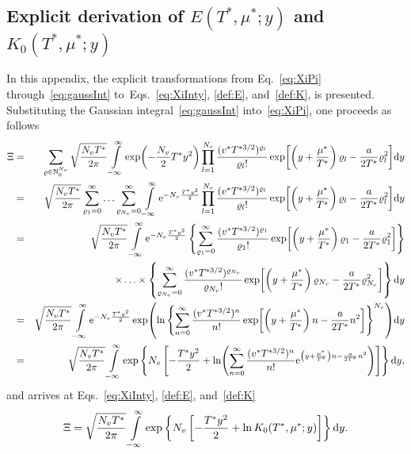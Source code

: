 \documentclass[12pt]{article}
\numberwithin{equation}{section}
\begin{document}
	\subsection{\label{sec:app1} Explicit derivation of $E(T^*,\mu^*;y)$ and $K_0(T^*,\mu^*;y)$}
	In this appendix, the explicit transformations from Eq.~\eqref{eq:XiPi} through~\eqref{eq:gaussInt} to~Eqs.~\eqref{eq:XiInty}, \eqref{def:E}, and~\eqref{def:K}, is presented. Substituting the Gaussian integral~\eqref{eq:gaussInt} into~\eqref{eq:XiPi}, one proceeds as follows
	\begin{eqnarray}
		\Xi 
		&=& 
		\sum_{\varrho \in \mathbb{N}_0^{N_v}} \sqrt{\frac{N_v T^*}{2\pi}} \int\limits_{-\infty}^{\infty} \exp(-\frac{N_v}{2} T^* y^2) 
		\prod\limits_{l=1}^{N_v} \frac{(v^* T^{*3/2})^{\varrho_l}}{\varrho_l !} 
		\exp[\left(y + \frac{\mu^*}{T^*}\right) \varrho_l - \frac{a}{2T^*}\varrho_l^2] {\rm d}y
		\nonumber\\
		&=&
		\sqrt{\frac{N_v T^*}{2\pi}} \sum_{\varrho_1=0}^{\infty} \ldots \sum_{\varrho_{N_v}=0}^{\infty} 
		\int\limits_{-\infty}^{\infty} {\rm e}^{-N_v \frac{T^* y^2}{2}} 
		\prod\limits_{l=1}^{N_v} \frac{(v^* T^{*3/2})^{\varrho_l}}{\varrho_l !} 
		\exp[\left(y + \frac{\mu^*}{T^*}\right) \varrho_l - \frac{a}{2T^*}\varrho_l^2] {\rm d}y
		\nonumber\\
		&=&
		\sqrt{\frac{N_v T^*}{2\pi}} \int\limits_{-\infty}^{\infty} {\rm e}^{-N_v \frac{T^* y^2}{2}}
		\left\{ 
			\sum_{\varrho_1=0}^{\infty} \frac{(v^* T^{*3/2})^{\varrho_1}}{\varrho_1 !} \exp[\left(y + \frac{\mu^*}{T^*}\right) \varrho_1 - \frac{a}{2T^*}\varrho_1^2] 
		\right\}
		\nonumber\\
		&& 
		\times \ldots \times 
		\left\{ 
			\sum_{\varrho_{N_v}=0}^{\infty} \frac{(v^* T^{*3/2})^{\varrho_{N_v}}}{\varrho_{N_v} !} \exp[\left(y + \frac{\mu^*}{T^*}\right) \varrho_{N_v} - \frac{a}{2T^*}\varrho_{N_v}^2] 
		\right\}
		{\rm d}y
		\nonumber\\
		&=&
		\sqrt{\frac{N_v T^*}{2\pi}} \int\limits_{-\infty}^{\infty} {\rm e}^{-N_v \frac{T^* y^2}{2}}
		\exp( \ln \left\{\sum_{n=0}^{\infty} \frac{(v^* T^{*3/2})^{n}}{n!} \exp[\left(y + \frac{\mu^*}{T^*}\right)n - \frac{a}{2T^*}n^2] \right\}^{N_v} ) {\rm d}y
		\nonumber\\
		&=&
		\sqrt{\frac{N_v T^*}{2\pi}} \int\limits_{-\infty}^{\infty}
		\exp 
		\left\{ N_v 
			\left[ -\frac{T^* y^2}{2} + 
			\ln(\sum_{n=0}^{\infty} \frac{(v^* T^{*3/2})^{n}}{n!} {\rm e}^{\left(y + \frac{\mu^*}{T^*}\right)n - \frac{a}{2T^*}n^2}) 
			\right] 
		\right\} {\rm d}y,
	\end{eqnarray}
	and arrives at Eqs.~\eqref{eq:XiInty}, \eqref{def:E}, and~\eqref{def:K}
	\begin{equation}
		\Xi = \sqrt{\frac{N_v T^*}{2\pi}} \int\limits_{-\infty}^{\infty}
		\exp 
		\left\{ N_v 
		\left[ -\frac{T^* y^2}{2} + 
		\ln K_0(T^*,\mu^*;y) 
		\right] 
		\right\} {\rm d}y.
	\end{equation}
	
\end{document}
